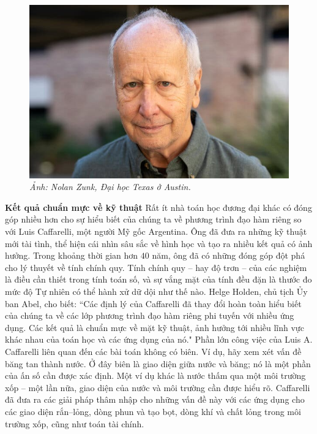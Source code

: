 \begin{multicols}{2}
	\begin{figure}[H]
		\vspace*{-5pt}
		\centering
		\captionsetup{labelformat= empty, justification=centering}
		\includegraphics[width= 1\linewidth]{2}
		\caption{\small\textit{\color{doisongtoanhoc}Ảnh: Nolan Zunk, Đại học Texas ở Austin.}}
		\vspace*{-10pt}
	\end{figure}
	\textbf{\color{doisongtoanhoc}Kết quả chuẩn mực về kỹ thuật}
	\vskip 0.1cm
	Rất ít nhà toán học đương đại khác có đóng góp nhiều hơn cho sự hiểu biết của chúng ta về phương trình đạo hàm riêng so với Luis Caffarelli, một người Mỹ gốc Argentina. Ông đã đưa ra những kỹ thuật mới tài tình, thể hiện cái nhìn sâu sắc về hình học và tạo ra nhiều kết quả có ảnh hưởng. Trong khoảng thời gian hơn $40$ năm, ông đã có những đóng góp đột phá cho lý thuyết về tính chính quy. Tính chính quy -- hay độ trơn -- của các nghiệm là điều cần thiết trong tính toán số, và sự vắng mặt của tính đều đặn là thước đo mức độ Tự nhiên có thể hành xử dữ dội như thế nào.
	\vskip 0.1cm
	Helge Holden, chủ tịch Ủy ban Abel, cho biết: ``Các định lý của Caffarelli đã thay đổi hoàn toàn hiểu biết của chúng ta về các lớp phương trình đạo hàm riêng phi tuyến với nhiều ứng dụng. Các kết quả là chuẩn mực về mặt kỹ thuật, ảnh hưởng tới nhiều lĩnh vực khác nhau của toán học và các ứng dụng của nó." 
	\vskip 0.1cm
	Phần lớn công việc của Luis A. Caffarelli liên quan đến các bài toán không có biên.  Ví dụ, hãy xem xét vấn đề băng tan thành nước. Ở đây biên là giao diện giữa nước và băng; nó là một phần của ấn số cần được xác định. Một ví dụ khác là nước thấm qua một môi trường xốp -- một lần nữa, giao diện của nước và môi trường cần được hiểu rõ. Caffarelli đã đưa ra các giải pháp thâm nhập cho những vấn đề này với các ứng dụng cho các giao diện rắn--lỏng, dòng phun và tạo bọt, dòng khí và chất lỏng trong môi trường xốp, cũng như toán tài chính.

\end{multicols}
